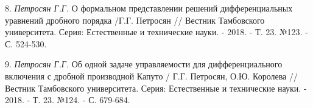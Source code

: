 8. {\it Петросян Г.Г.} О формальном представлении решений дифференциальных уравнений дробного порядка /Г.Г. Петросян // Вестник Тамбовского университета. Серия: Естественные и технические науки. -  2018. - Т. 23. №123. - С. 524-530.

9. {\it Петросян Г.Г.} Об одной задаче управляемости для дифференциального включения с дробной производной Капуто  / Г.Г. Петросян, О.Ю. Королева // Вестник Тамбовского университета. Серия: Естественные и технические науки. - 2018. - Т. 23. №124. - С. 679-684.











